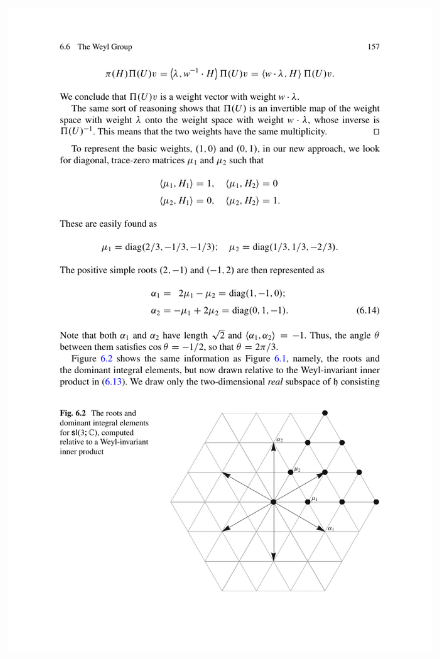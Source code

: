 \documentclass[../main.tex]{subfiles}
\begin{document}
\begin{figure}[h!]
	\includegraphics{images/hall_167_c.pdf}
	\caption[]{}
\end{figure}
\end{document}
